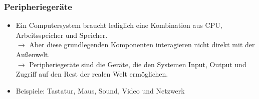 	\subsubsection{Peripheriegeräte}
	\begin{itemize}
		\item Ein Computersystem braucht lediglich eine Kombination aus CPU, Arbeitsspeicher und Speicher. \\
		$\rightarrow$ Aber diese grundlegenden Komponenten interagieren nicht direkt mit der Außenwelt.\\
		$\rightarrow$ Peripheriegeräte sind die Geräte, die den Systemen Input, Output und Zugriff auf den Rest der realen Welt ermöglichen.
		\item Beispiele: Tastatur, Maus, Sound, Video und Netzwerk
	\end{itemize}

~\\~\\
